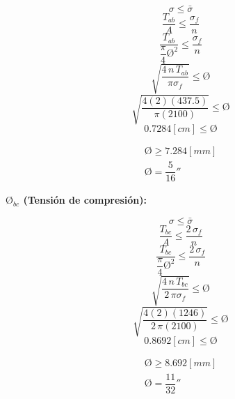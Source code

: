 \documentclass[letter,10pt,twoside]{article}
\begin{document}
\begin{equation*}
    \sigma \le \bar{\sigma}
\end{equation*}
\begin{equation*}
    \frac{T_{ab}}{A} \le \frac{\sigma_f}{n}
\end{equation*}
\begin{equation*}
    \frac{T_{ab}}{\dfrac{\pi}{4} \text{\O}^2} \le \frac{\sigma_f}{n}
\end{equation*}
\begin{equation*}
    \sqrt{\frac{4\,n\,T_{ab}}{\pi\sigma_f}} \le \text{\O}
\end{equation*}
\begin{equation*}
    \sqrt{\frac{4(2)(437.5)}{\pi(2100)}} \le \text{\O}
\end{equation*}
\begin{equation*}
    0.7284[cm] \le \text{\O}
\end{equation*}

\begin{equation*}
\boxed{
    \begin{array}{l}
        \text{\O} \ge 7.284[mm] \\
        \text{\O} = \dfrac{5}{16}''
    \end{array}
}
\end{equation*}

\textbf{$\text{\O}_{bc}$ (Tensión de compresión):}

\begin{equation*}
    \sigma \le \bar{\sigma}
\end{equation*}
\begin{equation*}
    \frac{T_{bc}}{A} \le \frac{2\,\sigma_f}{n}
\end{equation*}
\begin{equation*}
    \frac{T_{bc}}{\dfrac{\pi}{4} \text{\O}^2} \le \frac{2\,\sigma_f}{n}
\end{equation*}
\begin{equation*}
    \sqrt{\frac{4\,n\,T_{bc}}{2\,\pi\sigma_f}} \le \text{\O}
\end{equation*}
\begin{equation*}
    \sqrt{\frac{4(2)(1246)}{2\,\pi(2100)}} \le \text{\O}
\end{equation*}
\begin{equation*}
    0.8692[cm] \le \text{\O}
\end{equation*}

\begin{equation*}
\boxed{
    \begin{array}{l}
        \text{\O} \ge 8.692[mm] \\
        \text{\O} = \dfrac{11}{32}''
    \end{array}
}
\end{equation*}
\end{document}
